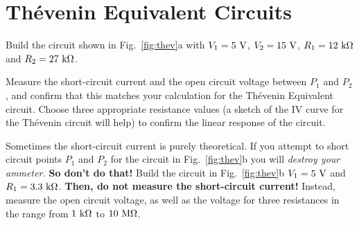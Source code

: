 \documentclass[12pt]{article}
\begin{document}
\section{Th\'{e}venin Equivalent Circuits}

Build the circuit shown in Fig.~\ref{fig:thev}a with $V_1=5~\rm{V}$, $V_2=15~\rm{V}$, 
$R_1=12~\rm{k\Omega}$ and $R_2=27~\rm{k\Omega}$.

Measure the short-circuit current and the open circuit voltage between $P_1$ and $P_2$, and confirm that this matches your calculation for the Th\'{e}venin Equivalent circuit.  Choose three appropriate resistance values (a sketch of the IV curve for the Th\'{e}venin circuit will help) to confirm the linear response of the circuit.


Sometimes the short-circuit current is purely theoretical.  If you attempt to short circuit points $P_1$ and $P_2$ for the circuit in Fig.~\ref{fig:thev}b you will \textit{destroy your ammeter.}  \textbf{So don't do that!}
Build the circuit in Fig.~\ref{fig:thev}b $V_1=5~\rm{V}$ and $R_1=3.3~\rm{k\Omega}$.
\textbf{Then, do not measure the short-circuit current!}  Instead, measure the open circuit voltage, as well as the voltage for three resistances in the range from $1~\rm{k\Omega}$ to $10~\rm{M\Omega}$.
\end{document}
